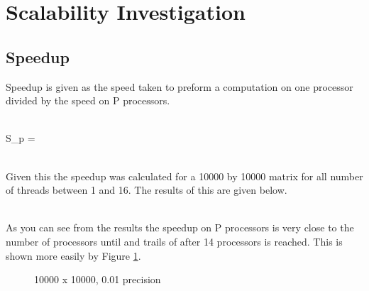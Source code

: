 \documentclass{article}
\begin{document}
\section{Scalability Investigation}
\subsection{Speedup}
Speedup is given as the speed taken to preform a computation on one processor
divided by the speed on P processors.\\~\\
\begin{center}
S_p = \\~\\
\end{center}
Given this the speedup was calculated for a 10000 by 10000 matrix for all number
of threads between 1 and 16. The results of this are given below.\\~\\
\begin{center}
\end{center}

As you can see from the results the speedup on P processors is very close to the
number of processors until and trails of after 14 processors is reached. This is
shown more easily by Figure \ref{fig:speedup}.\\

\begin{figure}[H]
 \centering
 \caption{10000 x 10000, 0.01 precision}
 \label{fig:speedup}
 \end{figure}\\~\\
\end{document}
